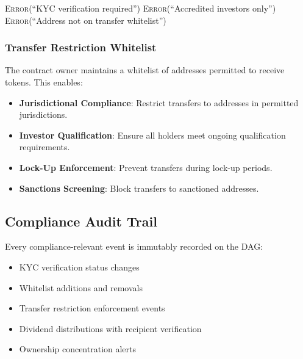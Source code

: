 \documentclass[11pt,a4paper,twoside]{article}
\begin{document}
\begin{algorithm}[H]
\caption{KYC-Gated Transfer}
\label{alg:kyc-transfer}
\begin{algorithmic}[1]
      \State \Return \textsc{Error}(``KYC verification required'')
    \EndIf
  \EndIf
      \State \Return \textsc{Error}(``Accredited investors only'')
    \EndIf
  \EndIf
      \State \Return \textsc{Error}(``Address not on transfer whitelist'')
    \EndIf
  \EndIf
  \State {}
\EndProcedure
\end{algorithmic}
\end{algorithm}

\subsubsection{Transfer Restriction Whitelist}

The contract owner maintains a whitelist of addresses permitted to receive tokens. This enables:

\begin{itemize}
  \item \textbf{Jurisdictional Compliance}: Restrict transfers to addresses in permitted jurisdictions.
  \item \textbf{Investor Qualification}: Ensure all holders meet ongoing qualification requirements.
  \item \textbf{Lock-Up Enforcement}: Prevent transfers during lock-up periods.
  \item \textbf{Sanctions Screening}: Block transfers to sanctioned addresses.
\end{itemize}

\subsection{Compliance Audit Trail}

Every compliance-relevant event is immutably recorded on the DAG:

\begin{itemize}
  \item KYC verification status changes
  \item Whitelist additions and removals
  \item Transfer restriction enforcement events
  \item Dividend distributions with recipient verification
  \item Ownership concentration alerts
\end{itemize}
\end{document}
